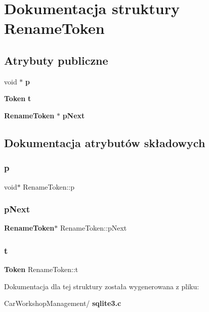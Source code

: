 \section{Dokumentacja struktury Rename\+Token}
\label{struct_rename_token}
\subsection*{Atrybuty publiczne}
\begin{DoxyCompactItemize}
\item 
void $\ast$ \textbf{ p}
\item 
\textbf{ Token} \textbf{ t}
\item 
\textbf{ Rename\+Token} $\ast$ \textbf{ p\+Next}
\end{DoxyCompactItemize}


\subsection{Dokumentacja atrybutów składowych}
\mbox{\label{struct_rename_token_aeab24a8a5133b1320bc0cbf78d91e2b3}} 
\subsubsection{p}
{\footnotesize\ttfamily void$\ast$ Rename\+Token\+::p}

\mbox{\label{struct_rename_token_acbed14486b0ea511e5f283e711f5e84e}} 
\subsubsection{pNext}
{\footnotesize\ttfamily \textbf{ Rename\+Token}$\ast$ Rename\+Token\+::p\+Next}

\mbox{\label{struct_rename_token_afb02b5eb5f54f4b8fe1615ef52722de2}} 
\subsubsection{t}
{\footnotesize\ttfamily \textbf{ Token} Rename\+Token\+::t}



Dokumentacja dla tej struktury została wygenerowana z pliku\+:\begin{DoxyCompactItemize}
\item 
Car\+Workshop\+Management/\textbf{ sqlite3.\+c}\end{DoxyCompactItemize}
